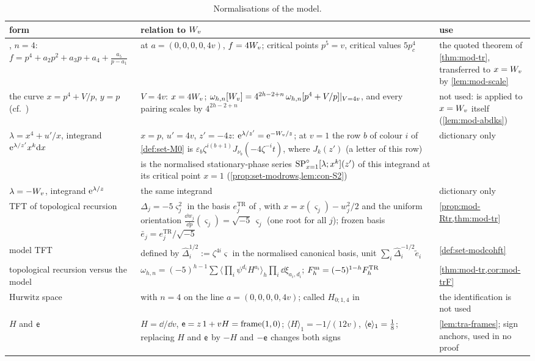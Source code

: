 \begin{table}[ht]
\caption{Normalisations of the model.}
\label{tab:sgn-model}
\centering
\footnotesize
\renewcommand{\arraystretch}{1.2}
\begin{tabular}{@{}>{\raggedright\arraybackslash}p{}>{\raggedright\arraybackslash}p{}>{\raggedright\arraybackslash}p{}@{}}
\hline
form & relation to $W_{v}$ & use \\
\hline
\cite[(8-1)]{Dunin-Barkowski:2015caa}, $n=4$: $f=p^4+a_2p^2+a_3p+a_4+\frac{a_5}{p-a_1}$ & at $a=(0,0,0,0,4v)$, $f=4W_{v}$; critical points $p^5=v$, critical values $5p_c^4$ & the quoted theorem of \cref{thm:mod-tr}, transferred to $x=W_{v}$ by \cref{lem:mod-scale} \\
the curve $x=p^4+V/p$, $y=p$ (cf.\ \cite[(7.2)]{ABDKS25}) & $V=4v$: $x=4W_{v}$; $\omega_{h,n}[W_{v}]=4^{2h-2+n}\,\omega_{h,n}[p^4+V/p]|_{V=4v}$, and every pairing scales by $4^{2h-2+n}$ & not used: \cite[Theorem~7.1]{ABDKS25} is applied to $x=W_{v}$ itself (\cref{lem:mod-abdks}) \\
$\lambda=x^4+u'/x$, integrand $\mathrm{e}^{\lambda/z'}x^k\mathrm{d} x$ & $x=p$, $u'=4v$, $z'=-4z$: $\mathrm{e}^{\lambda/z'}=\mathrm{e}^{-W_{v}/z}$; at $v=1$ the row $b$ of colour $i$ of \cref{def:set-M0} is $\varepsilon_b\zeta^{i(b+1)}J_{\nu_b}(-4\zeta^{-i}t)$, where $J_k(z')$ (a letter of this row) is the normalised stationary-phase series $\mathrm{SP}^{\circ}_{x=1}[\lambda;x^k](z')$ of this integrand at its critical point $x=1$ (\cref{prop:set-modrows,lem:con-S2}) & dictionary only \\
$\lambda=-W_{v}$, integrand $\mathrm{e}^{\lambda/z}$ & the same integrand & dictionary only \\
TFT of topological recursion & $\Delta_j=-5\varsigma_j^2$ in the basis $e^{\mathrm{TR}}_j$ of \cite[(2-30)]{Dunin-Barkowski:2015caa}, with $x=x(\varsigma_j)-w_j^2/2$ and the uniform orientation $\frac{\dd w_j}{\dd p}(\varsigma_j)=\sqrt{-5}\,\varsigma_j$ (one root for all $j$); frozen basis $\bar e_j=e^{\mathrm{TR}}_j/\sqrt{-5}$ & \cref{prop:mod-Rtr,thm:mod-tr} \\
model TFT & defined by $\hat\Delta_i^{1/2}:=\zeta^{4i}\varsigma$ in the normalised canonical basis, unit $\sum_i\hat\Delta_i^{-1/2}\tilde e_i$ & \cref{def:set-modcohft} \\
topological recursion versus the model & $\omega_{h,n}=(-5)^{h-1}\sum\langle\prod_i\psi^{d_i}H^{a_i}\rangle_h\prod_i\dd\xi_{a_i,d_i}$; $F^{\mathrm{m}}_h=(-5)^{1-h}F^{\mathrm{TR}}_h$ & \cref{thm:mod-tr,cor:mod-trF} \\
Hurwitz space & \cite[(8-1)]{Dunin-Barkowski:2015caa} with $n=4$ on the line $a=(0,0,0,0,4v)$; called $H_{0;1,4}$ in \cite{CvdLPS23} & the identification is not used \\
$H$ and $\mathsf{e}$ & $H=\dd/\dd v$, $\mathsf{e}=z\,1+vH=\mathrm{frame}(1,0)$; $\langle H\rangle_1=-1/(12v)$, $\langle\mathsf{e}\rangle_1=\frac18$; replacing $H$ and $\mathsf{e}$ by $-H$ and $-\mathsf{e}$ changes both signs & \cref{lem:tra-frames}; sign anchors, used in no proof \\
\hline
\end{tabular}
\end{table}


